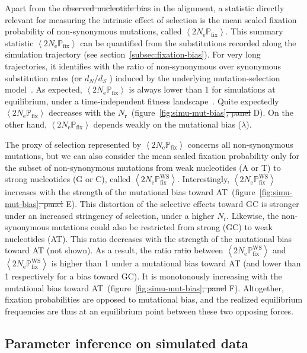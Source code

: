 \documentclass{article}
\newcommand{\Ne}{N_{\text{e}}} %
\newcommand{\Ner}{N_{\text{r}}} %
\newcommand{\dn}{d_N} %
\newcommand{\ds}{d_S} %
\newcommand{\dnds}{\dn / \ds} %
\newcommand{\proba}{\mathbb{P}} %
\newcommand{\Pfix}{2 \Ne \proba_{\text{fix}}} %
\newcommand{\avgpfix}{\left\langle \Pfix \right\rangle } %
\newcommand{\avgpfixATtoGC}{\left\langle \Pfix^{\text{WS}} \right\rangle } %
\providecommand{\DIFaddtex}[1]{{\protect\color{blue}\uwave{#1}}} %
\providecommand{\DIFdeltex}[1]{{\protect\color{red}\sout{#1}}}                      %
\providecommand{\DIFaddbegin}{} %
\providecommand{\DIFaddend}{} %
\providecommand{\DIFdelbegin}{} %
\providecommand{\DIFdelend}{} %
\providecommand{\DIFadd}[1]{\texorpdfstring{\DIFaddtex{#1}}{#1}} %
\providecommand{\DIFdel}[1]{\texorpdfstring{\DIFdeltex{#1}}{}} %
\begin{document}
Apart from the \DIFdelbegin \DIFdel{observed nucleotide bias }\DIFdelend \DIFaddbegin \DIFadd{nucleotide bias observed }\DIFaddend in the alignment, a statistic directly relevant for measuring the intrinsic effect of selection is the mean scaled fixation probability of {non-synonymous} mutations, called $\avgpfix$.
This summary statistic $\avgpfix$ can be quantified from the {substitutions} recorded along the simulation trajectory (see section~\ref{subsec:fixation-bias}).
For very long trajectories, it identifies with the ratio of {non-synonymous} over {synonymous} {substitution} rates (\DIFdelbegin \DIFdel{or }\DIFdelend $\dnds$ \DIFaddbegin \DIFadd{or $\omega$}\DIFaddend ) induced by the underlying mutation-selection model~\citep{Spielman2015, DosReis2015, Jones2016}.
As expected, $\avgpfix$ is always lower than 1 for simulations at equilibrium, under a time-independent fitness landscape~\citep{Spielman2015}.
Quite expectedly $\avgpfix$ decreases with the $\Ner$~(figure~\ref{fig:simu-mut-bias}\DIFdelbegin \DIFdel{, panel }\DIFdelend D).
On the other hand, $\avgpfix$ depends weakly on the mutational bias ($\lambda$).

The proxy of selection represented by $\avgpfix$ concerns all {non-synonymous} mutations, but we can also consider the mean scaled fixation probability only for the subset of {non-synonymous} mutations from weak nucleotides (A or T) to strong nucleotides (G or C), called $\avgpfixATtoGC$.
Interestingly, $\avgpfixATtoGC$ increases with the strength of the mutational bias toward AT~(figure~\ref{fig:simu-mut-bias}\DIFdelbegin \DIFdel{, panel }\DIFdelend E).
This distortion of the selective effects toward GC is stronger under an increased stringency of selection, under a higher $\Ner$.
Likewise, the {non-synonymous} mutations could also be restricted from strong (GC) to weak nucleotides (AT).
This ratio decreases with the strength of the mutational bias toward AT (not shown).
As a result, the ratio \DIFdelbegin \DIFdel{ratio }\DIFdelend between $\avgpfixATtoGC$ and $\avgpfixATtoGC$ is higher than 1 under a mutational bias toward AT (and lower than 1 respectively for a bias toward GC).
It is monotonously increasing with the mutational bias toward AT~(figure~\ref{fig:simu-mut-bias}\DIFdelbegin \DIFdel{, panel }\DIFdelend F).
Altogether, fixation probabilities are opposed to mutational bias, and the realized equilibrium frequencies are thus at an equilibrium point between these two opposing forces.

\subsection{Parameter inference on simulated data}
\label{subsec:parameter-inference-on-simulated-data}
\end{document}

